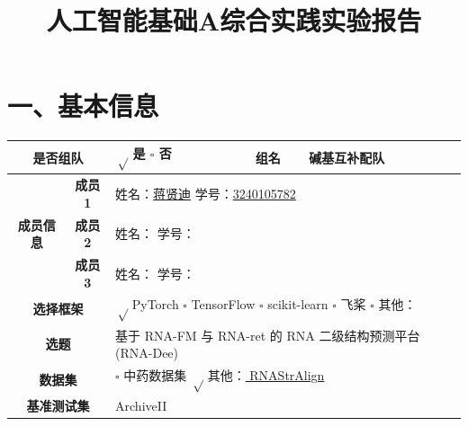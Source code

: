 \documentclass[a4paper,12pt]{article}
\title{\textbf{\fontsize{18pt}{22pt}\selectfont 人工智能基础A综合实践实验报告}}
\author{}
\date{}
\begin{document}
\vspace{-2em}

\maketitle
\thispagestyle{fancy} %

\vspace{-3cm}

\section*{一、基本信息}

\begin{table}[H]
    \centering
    \renewcommand{\arraystretch}{1.6} %
    \setlength{\tabcolsep}{8pt}       %
    \begin{tabular}{|c|c|l|c|l|}
        \hline
        \multicolumn{2}{|c|}{\textbf{是否组队}} & \multicolumn{1}{l|}{$√$ 是 \quad $\square$ 否} & \multicolumn{1}{c|}{\textbf{组名}} & \multicolumn{1}{l|}{碱基互补配队} \\ 
        \hline
        \multirow{3}{*}{\textbf{成员信息}} & \textbf{成员1} & \multicolumn{3}{l|}{姓名：\underline{蒋贤迪} \quad 学号：\underline{3240105782}} \\ \cline{2-5}
         & \textbf{成员2} & \multicolumn{3}{l|}{姓名：\underline{\hspace{4cm}} \quad 学号：\underline{\hspace{4cm}}} \\ \cline{2-5}
         & \textbf{成员3} & \multicolumn{3}{l|}{姓名：\underline{\hspace{4cm}} \quad 学号：\underline{\hspace{4cm}}} \\
        \hline
        \multicolumn{2}{|c|}{\textbf{选择框架}} & \multicolumn{3}{l|}{$√$ PyTorch \quad $\square$ TensorFlow \quad $\square$ scikit-learn \quad $\square$ 飞桨 \quad $\square$ 其他：\underline{\hspace{1cm}}} \\
        \hline
        \multicolumn{2}{|c|}{\textbf{选题}} & \multicolumn{3}{l|}{基于 RNA-FM 与 RNA-ret 的 RNA 二级结构预测平台 (RNA-Dee)} \\
        \hline
        \multicolumn{2}{|c|}{\textbf{数据集}} & \multicolumn{3}{l|}{$\square$ 中药数据集 \quad $√$ 其他：\underline{\hspace{0.5cm} RNAStrAlign \hspace{0.5cm}}} \\
        \hline
        \multicolumn{2}{|c|}{\textbf{基准测试集}} & \multicolumn{3}{l|}{ArchiveII} \\
        \hline
    \end{tabular}
    \vspace{0.5em}
\end{table}
\end{document}
